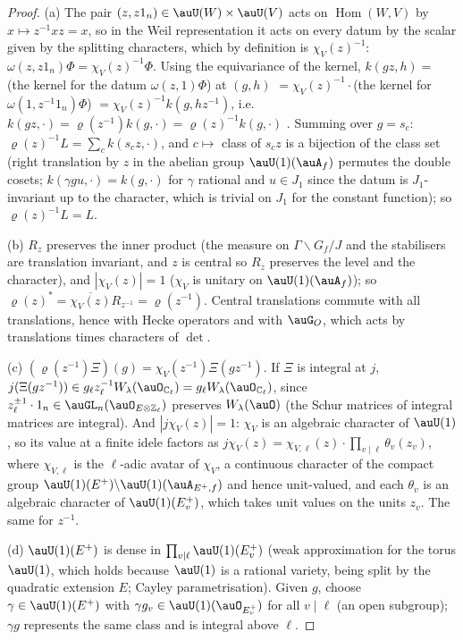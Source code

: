\documentclass[10pt]{amsart}
\theoremstyle{definition}
\theoremstyle{remark}
\newcommand{\C}{\mathbb C}
\newcommand{\Z}{\mathbb Z}
\begin{document}
\begin{proof}
(a) The pair $(z,z1_n)\in\auU(W)\times\auU(V)$ acts on $\operatorname{Hom}(W,V)$ by $x\mapsto
z^{-1}xz=x$, so in the Weil representation it acts on every datum by the scalar given by the
splitting characters, which by definition is $\chi_V(z)^{-1}$: $\omega(z,z1_n)\Phi=\chi_V(z)^{-1}
\Phi$. Using the equivariance of the kernel, $k(gz,h)=$ (the kernel for the datum $\omega(z,1)\Phi$)
at $(g,h)$ $=\chi_V(z)^{-1}\cdot$(the kernel for $\omega(1,z^{-1}1_n)\Phi$) $=\chi_V(z)^{-1}k(g,hz^{-1})$,
i.e.\ $k(g z,\cdot)=\varrho(z^{-1})k(g,\cdot)=\varrho(z)^{-1}k(g,\cdot)$ . Summing over $g=s_c$: $\varrho(z)^{-1}L=\sum_ck(s_cz,\cdot)$,
and $c\mapsto$ class of $s_cz$ is a bijection of the class set (right translation by $z$ in the
abelian group $\auU(1)(\auA_f)$ permutes the double cosets; $k(\gamma g u,\cdot)=k(g,\cdot)$ for
$\gamma$ rational and $u\in J_1$ since the datum is $J_1$-invariant up to the character, which is
trivial on $J_1$ for the constant function); so $\varrho(z)^{-1}L=L$.

(b) $R_z$ preserves the inner product (the measure on $\Gamma\backslash G_f/J$ and the stabilisers
are translation invariant, and $z$ is central so $R_z$ preserves the level and the character), and
$|\chi_V(z)|=1$ ($\chi_V$ is unitary on $\auU(1)(\auA_f)$); so $\varrho(z)^*=\overline{\chi_V(z)}
R_{z^{-1}}=\varrho(z^{-1})$. Central translations commute with all translations, hence with Hecke
operators and with $\auG_O$, which acts by translations times characters of $\det$.

(c) $(\varrho(z^{-1})\Xi)(g)=\chi_V(z^{-1})\Xi(gz^{-1})$. If $\Xi$ is integral at $j$,
$j(\Xi(gz^{-1}))\in g_\ell z^{-1}_\ell W_\lambda(\auO_{\C_\ell})=g_\ell W_\lambda(\auO_{\C_\ell})$,
since $z_\ell^{\pm1}\cdot1_n\in\auGL_n(\auO_{E\otimes\Z_\ell})$ preserves $W_\lambda(\auO)$ (the
Schur matrices of integral matrices are integral). And $|j\chi_V(z)|=1$: $\chi_V$ is an algebraic
character of $\auU(1)$, so its value at a finite idele factors as $j\chi_V(z)=\chi_{V,\ell}(z)\cdot
\prod_{v\mid\ell}\theta_v(z_v)$, where $\chi_{V,\ell}$ is the $\ell$-adic avatar of $\chi_V$, a continuous
character of the compact group $\auU(1)(E^+)\backslash\auU(1)(\auA_{E^+,f})$ and hence unit-valued, and
each $\theta_v$ is an algebraic character of $\auU(1)(E^+_v)$, which takes unit values on the units
$z_v$. The same for $z^{-1}$.

(d) $\auU(1)(E^+)$ is dense in $\prod_{v\mid\ell}\auU(1)(E^+_v)$ (weak approximation for the torus
$\auU(1)$, which holds because $\auU(1)$ is a rational variety, being split by the quadratic
extension $E$; Cayley parametrisation). Given $g$, choose $\gamma\in\auU(1)(E^+)$ with $\gamma
g_v\in\auU(1)(\auO_{E^+_v})$ for all $v\mid\ell$ (an open subgroup); $\gamma g$ represents the same
class and is integral above $\ell$.


\end{proof}
\end{document}
